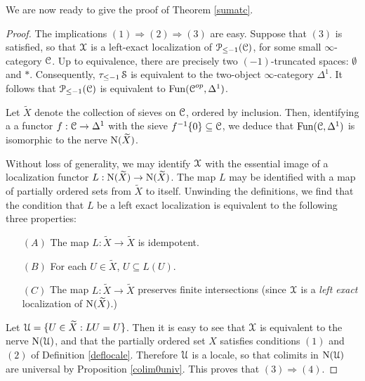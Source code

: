 We are now ready to give the proof of Theorem \ref{sumatc}.

\begin{proof}
The implications $(1) \Rightarrow (2) \Rightarrow (3)$ are easy. Suppose that $(3)$ is satisfied, so that $\operatorname{\mathcal{X}}$ is a left-exact localization of $\operatorname{\mathcal{P}}_{\leq -1}(\operatorname{\mathcal{C}})$, for some small $\infty$-category $\operatorname{\mathcal{C}}$. Up to equivalence, there are precisely two $(-1)$-truncated spaces: $\emptyset$ and $\ast$. Consequently, $\tau_{\leq -1} \operatorname{\mathcal{S}}$ is equivalent to the 
two-object $\infty$-category $\Delta^1$. It follows that $\operatorname{\mathcal{P}}_{\leq -1}(\operatorname{\mathcal{C}})$ is equivalent
to $\operatorname{Fun}( \operatorname{\mathcal{C}}^{op},\Delta^1)$.

Let $\widetilde{X}$ denote the collection of sieves on $\operatorname{\mathcal{C}}$, ordered by inclusion. Then, identifying a
a functor $f: \operatorname{\mathcal{C}} \rightarrow \Delta^1$
with the sieve $f^{-1} \{0\} \subseteq \operatorname{\mathcal{C}}$, we deduce that
$\operatorname{Fun}(\operatorname{\mathcal{C}}, \Delta^1)$ is isomorphic to the nerve $\operatorname{N}(\widetilde{X})$.

Without loss of generality, we may identify $\operatorname{\mathcal{X}}$ with the essential image of a localization
functor $L: \operatorname{N}(\widetilde{X}) \rightarrow \operatorname{N}(\widetilde{X})$. The map $L$ may be identified with a map
of partially ordered sets from $\widetilde{X}$ to itself. Unwinding the definitions, we find that the condition that $L$ be a left exact localization is equivalent to the following three properties:

\begin{itemize}
\item[$(A)$] The map $L: \widetilde{X} \rightarrow \widetilde{X}$ is idempotent.
\item[$(B)$] For each $U \in \widetilde{X}$, $U \subseteq L(U)$.
\item[$(C)$] The map $L: \widetilde{X} \rightarrow \widetilde{X}$ preserves
finite intersections (since $\operatorname{\mathcal{X}}$ is a {\em left exact} localization of $\operatorname{N}(\widetilde{X})$.)
\end{itemize}

Let $\operatorname{\mathcal{U}} = \{ U \in \widetilde{X}: LU = U \}$.
Then it is easy to see that $\operatorname{\mathcal{X}}$ is equivalent to the nerve $\operatorname{N}(\operatorname{\mathcal{U}})$, and that the partially ordered set $X$ satisfies conditions $(1)$ and $(2)$ of Definition \ref{deflocale}. Therefore $\operatorname{\mathcal{U}}$ is a locale, so that colimits in $\operatorname{N}( \operatorname{\mathcal{U}})$ are universal by Proposition \ref{colim0univ}. This proves that $(3) \Rightarrow (4)$. 


\end{proof}
